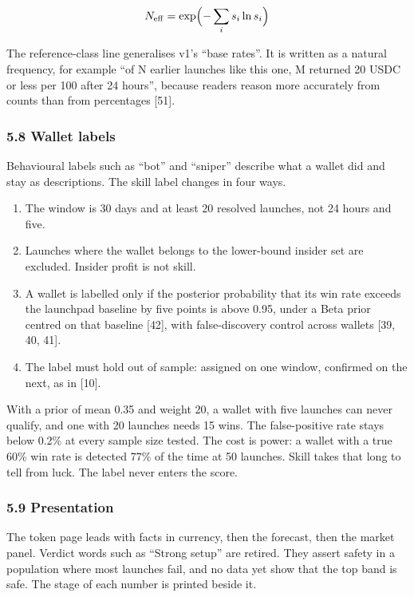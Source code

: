 \[
N_{\mathrm{eff}} = \exp\Bigl(-\sum_i s_i \ln s_i\Bigr)
\]

The reference-class line generalises v1's ``base rates''. It is written as a natural frequency, for example ``of N earlier launches like this one, M returned 20 USDC or less per 100 after 24 hours'', because readers reason more accurately from counts than from percentages {[}51{]}.

\subsubsection{5.8 Wallet labels}\label{wallet-labels}

Behavioural labels such as ``bot'' and ``sniper'' describe what a wallet did and stay as descriptions. The skill label changes in four ways.

\begin{enumerate}
\def\labelenumi{\arabic{enumi}.}
\tightlist
\item
  The window is 30 days and at least 20 resolved launches, not 24 hours and five.
\item
  Launches where the wallet belongs to the lower-bound insider set are excluded. Insider profit is not skill.
\item
  A wallet is labelled only if the posterior probability that its win rate exceeds the launchpad baseline by five points is above 0.95, under a Beta prior centred on that baseline {[}42{]}, with false-discovery control across wallets {[}39, 40, 41{]}.
\item
  The label must hold out of sample: assigned on one window, confirmed on the next, as in {[}10{]}.
\end{enumerate}

With a prior of mean 0.35 and weight 20, a wallet with five launches can never qualify, and one with 20 launches needs 15 wins. The false-positive rate stays below 0.2\% at every sample size tested. The cost is power: a wallet with a true 60\% win rate is detected 77\% of the time at 50 launches. Skill takes that long to tell from luck. The label never enters the score.

\subsubsection{5.9 Presentation}\label{presentation}

The token page leads with facts in currency, then the forecast, then the market panel. Verdict words such as ``Strong setup'' are retired. They assert safety in a population where most launches fail, and no data yet show that the top band is safe. The stage of each number is printed beside it.

